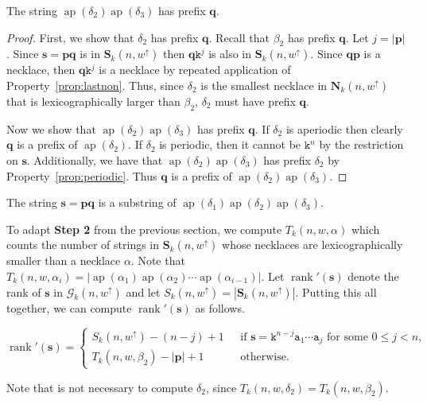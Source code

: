 \documentclass[US-letter,USenglish,authorcolumns,autoref]{lipics-v2021}
\renewcommand{\tt} {\mathtt}
\newcommand{\bS}{\mathbf{S}}
\newcommand{\bN}{\mathbf{N}}
\newcommand{\bp}{\mathbf{p}}
\newcommand{\bs}{\mathbf{s}}
\newcommand{\bq}{\mathbf{q}}
\newenvironment{frshaded2*}{%
    \def\FrameCommand{\fboxrule=\FrameRule\fboxsep=\FrameSep \fcolorbox{lipicsLineGray}{shadecolor}}%
    \MakeFramed {\advance\hsize-\width \FrameRestore}}%
    {\endMakeFramed}
\newenvironment{result}{
 \begin{frshaded2*}
}{%
\end{frshaded2*}

}
\DeclareMathOperator{\ap}{ap}
\DeclareMathOperator{\rank}{rank}
\begin{document}
\begin{lemma} \label{lem:d2}
   The string $\ap(\delta_2)\ap(\delta_3)$ has prefix $\bq$.
\end{lemma}
%
\begin{proof}
First, we show that $\delta_2$ has prefix $\bq$. Recall that $\beta_2$ has prefix $\bq$.  Let $j = |\bp|$.  Since $\bs = \bp\bq$ is in $\bS_k(n,w^\uparrow)$ then $\bq\tt{k}^j$ is also in $\bS_k(n,w^\uparrow)$.
Since $\bq\bp$ is a necklace, then  $\bq\tt{k}^j$ is a necklace by repeated application of Property~\ref{prop:lastnon}.  Thus, since $\delta_2$ is the smallest necklace in $\bN_k(n,w^\uparrow)$ that is lexicographically larger than $\beta_2$, $\delta_2$ must have prefix $\bq$.

Now we show that $\ap(\delta_2)\ap(\delta_3)$ has prefix $\bq$. If $\delta_2$ is aperiodic then clearly $\bq$ is a prefix of $\ap(\delta_2)$. 
If $\delta_2$ is periodic, then it cannot be $\tt{k}^n$ by the restriction on $\bs$. Additionally, we have that $\ap(\delta_2)\ap(\delta_3)$ has prefix $\delta_2$ by Property~\ref{prop:periodic}. Thus $\bq$ is a prefix of $\ap(\delta_2)\ap(\delta_3)$.  
\end{proof}


\begin{corollary}
The string $\bs = \bp\bq$ is a substring of $\ap(\delta_1)\ap(\delta_2)\ap(\delta_3)$.
\end{corollary}


To adapt {\bf Step 2} from the previous section, we compute 
$T_k(n,w,\alpha)$ which counts the number of strings in $\bS_k(n,w^\uparrow)$ whose necklaces are lexicographically smaller than a necklace $\alpha$.
Note that $T_k(n,w,\alpha_i) = |\ap(\alpha_1)\ap(\alpha_2)\cdots\ap(\alpha_{i-1})|$. 
%
Let $\rank'(\bs)$ denote the rank of $\bs$ in $\mathcal{G}_k(n,w^\uparrow)$
and let $S_k(n,w^\uparrow) = |\bS_k(n,w^\uparrow)|$.
Putting this all together, we can compute $\rank'(\bs)$ as follows.

\begin{result} \noindent

\vspace{-0.05in}

\begin{center}
$\rank'(\bs) = \left\{ \begin{array}{ll}
         S_k(n,w^\uparrow)-(n-j)+1    \    &\ \  \mbox{if $\bs = \tt{k}^{n-j}\tt{a}_1\cdots \tt{a}_j$ for some $0 \leq j < n$,}\\
         T_k(n, w,\beta_2) - |\bp|+1 \  &\ \  \mbox{otherwise.} 
         \end{array} \right. $
\end{center}

\vspace{-0.1in}
\end{result}
%
\noindent
Note that is not necessary to compute $\delta_2$, since $T_k(n,w,\delta_2) = T_k(n,w,\beta_2)$.
\end{document}
